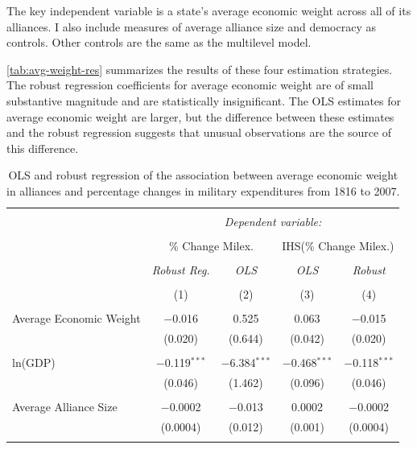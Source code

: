 \documentclass[12pt]{article}
\begin{document}
The key independent variable is a state's average economic weight across all of its alliances. 
I also include measures of average alliance size and democracy \citep{DigiuseppePoast2016} as controls. 
Other controls are the same as the multilevel model.  


\autoref{tab:avg-weight-res} summarizes the results of these four estimation strategies. 
The robust regression coefficients for average economic weight are of small substantive magnitude and are statistically insignificant. 
The OLS estimates for average economic weight are larger, but the difference between these estimates and the robust regression suggests that unusual observations are the source of this difference. 


\begin{table}[!htbp] \centering 
  \caption{OLS and robust regression of the association between average economic weight in alliances and percentage changes in military expenditures from 1816 to 2007.} 
  \label{tab:avg-weight-res} 
\begin{tabular}{@{\extracolsep{5pt}}lcccc} 
\\[-1.8ex]\hline 
\hline \\[-1.8ex] 
 & \multicolumn{4}{c}{\textit{Dependent variable:}} \\ 
\cline{2-5} 
\\[-1.8ex] & \multicolumn{2}{c}{\% Change Milex.} & \multicolumn{2}{c}{IHS(\% Change Milex.)} \\ 
\\[-1.8ex] & \textit{Robust Reg.} & \textit{OLS} & \textit{OLS} & \textit{Robust} \\ 
\\[-1.8ex] & (1) & (2) & (3) & (4)\\ 
\hline \\[-1.8ex] 
 Average Economic Weight & $-$0.016 & 0.525 & 0.063 & $-$0.015 \\ 
  & (0.020) & (0.644) & (0.042) & (0.020) \\ 
  & & & & \\ 
 ln(GDP) & $-$0.119$^{***}$ & $-$6.384$^{***}$ & $-$0.468$^{***}$ & $-$0.118$^{***}$ \\ 
  & (0.046) & (1.462) & (0.096) & (0.046) \\ 
  & & & & \\ 
 Average Alliance Size & $-$0.0002 & $-$0.013 & 0.0002 & $-$0.0002 \\ 
  & (0.0004) & (0.012) & (0.001) & (0.0004) \\ 
  & & & & \\ 

\end{tabular}
\end{table}
\end{document}
